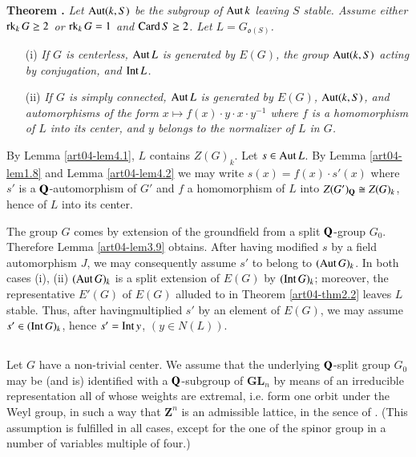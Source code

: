 \medskip
\noindent
{\bf Theorem .\label{art04-thm4.3}}
{\em Let $\operatorname{\mathrm{Aut}} (k,S)$ be the subgroup of $\operatorname{\mathrm{Aut}} k$ leaving $S$ stable. Assume either $\operatorname{\mathrm{rk}}_{k}G\geq 2$ or $\operatorname{\mathrm{rk}}_{k}G=1$ and $\operatorname{\mathrm{Card}} S\geq 2$. Let $L=G_{\mathfrak{o}(S)}$.}
\begin{itemize}
\item[{\rm(i)}] {\em If $G$ is centerless, $\operatorname{\mathrm{Aut}} L$ is generated by $E(G)$, the group $\operatorname{\mathrm{Aut}} (k,S)$ acting by conjugation, and $\operatorname{\mathrm{Int}} L$.}

\item[{\rm(ii)}] {\em If $G$ is simply connected, $\operatorname{\mathrm{Aut}} L$ is generated by $E(G)$, $\operatorname{\mathrm{Aut}}(k,S)$, and automorphisms of the form $x\mapsto f(x)\cdot y\cdot x\cdot y^{-1}$ where $f$ is a homomorphism of $L$ into its center, and $y$ belongs to the normalizer of $L$ in $G$.}
\end{itemize}

By Lemma \ref{art04-lem4.1}, $L$ contains $Z(G)_{k}$. Let $s\in \operatorname{\mathrm{Aut}} L$. By Lemma \ref{art04-lem1.8} and Lemma \ref{art04-lem4.2} we may write $s(x)=f(x)\cdot s'(x)$ where $s'$ is a $\mathbf{Q}$-automorphism of $G'$ and $f$ a homomorphism of $L$ into $Z(G')_{\mathbf{Q}}\cong Z(G)_{k}$, hence of $L$ into its center.

The group $G$ comes by extension of the groundfield from a split $\mathbf{Q}$-group $G_{0}$. Therefore Lemma \ref{art04-lem3.9} obtains. After having modified $s$ by a field automorphism $J$, we may consequently assume $s'$ to belong to $(\operatorname{\mathrm{Aut}} G)_{k}$. In both cases (i), (ii) $(\operatorname{\mathrm{Aut}} G)_{k}$ is a split extension of $E(G)$ by $(\operatorname{\mathrm{Int}} G)_{k}$; moreover, the representative $E'(G)$ of $E(G)$ alluded to in Theorem \ref{art04-thm2.2} leaves $L$ stable. Thus, after having\pageoriginale multiplied $s'$ by an element of $E(G)$, we may assume $s'\in (\operatorname{\mathrm{Int}} G)_{k}$, hence $s'=\operatorname{\mathrm{Int}} y$, $(y\in N(L))$.

\setcounter{subsection}{3}
\subsection{}\label{art04-sec4.4}
Let $G$ have a non-trivial center. We assume that the underlying $\mathbf{Q}$-split group $G_{0}$ may be (and is) identified with a $\mathbf{Q}$-subgroup of $\mathbf{GL}_{n}$ by means of an irreducible representation all of whose weights are extremal, i.e. form one orbit under the Weyl group, in such a way that $\mathbf{Z}^{n}$ is an admissible lattice, in the sence of \cite{art04-key10}. (This assumption is fulfilled in all cases, except for the one of the spinor group in a number of variables multiple of four.)

